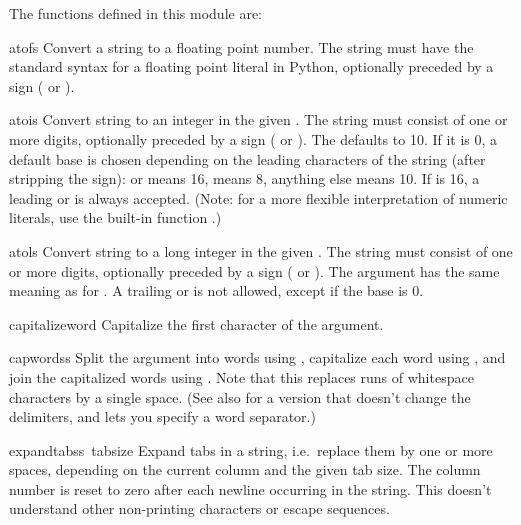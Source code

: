 The functions defined in this module are:

\renewcommand{\indexsubitem}{(in module string)}

\begin{funcdesc}{atof}{s}
Convert a string to a floating point number.  The string must have
the standard syntax for a floating point literal in Python, optionally
preceded by a sign (\samp{+} or \samp{-}).
\end{funcdesc}

\begin{funcdesc}{atoi}{s}
Convert string  to an integer in the given .  The
string must consist of one or more digits, optionally preceded by a
sign (\samp{+} or \samp{-}).  The  defaults to 10.  If it is
0, a default base is chosen depending on the leading characters of the
string (after stripping the sign):  or  means 16,
 means 8, anything else means 10.  If  is 16, a
leading  or  is always accepted.  (Note: for a more
flexible interpretation of numeric literals, use the built-in function
.)
\end{funcdesc}

\begin{funcdesc}{atol}{s}
Convert string  to a long integer in the given .  The
string must consist of one or more digits, optionally preceded by a
sign (\samp{+} or \samp{-}).  The  argument has the same
meaning as for .  A trailing  or  is not
allowed, except if the base is 0.
\end{funcdesc}

\begin{funcdesc}{capitalize}{word}
Capitalize the first character of the argument.
\end{funcdesc}

\begin{funcdesc}{capwords}{s}
Split the argument into words using , capitalize each word
using , and join the capitalized words using
.  Note that this replaces runs of whitespace characters by
a single space.  (See also  for a version
that doesn't change the delimiters, and lets you specify a word
separator.)
\end{funcdesc}

\begin{funcdesc}{expandtabs}{s\, tabsize}
Expand tabs in a string, i.e.\ replace them by one or more spaces,
depending on the current column and the given tab size.  The column
number is reset to zero after each newline occurring in the string.
This doesn't understand other non-printing characters or escape
sequences.
\end{funcdesc}

